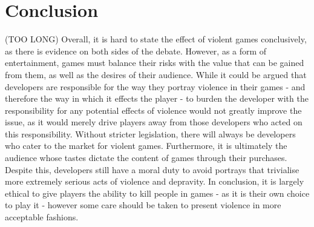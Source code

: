 \documentclass{scrartcl}
\begin{document}
	\section{Conclusion} (TOO LONG)
		Overall, it is hard to state the effect of violent games conclusively, as there is evidence on both sides of the debate. However, as a form of entertainment, games must balance their risks with the value that can be gained from them, as well as the desires of their audience. While it could be argued that developers are responsible for the way they portray violence in their games - and therefore the way in which it effects the player - to burden the developer with the responsibility for any potential effects of violence would not greatly improve the issue, as it would merely drive players away from those developers who acted on this responsibility. Without stricter legislation, there will always be developers who cater to the market for violent games. Furthermore, it is ultimately the audience whose tastes dictate the content of games through their purchases. Despite this, developers still have a moral duty to avoid portrays that trivialise more extremely serious acts of violence and depravity. In conclusion, it is largely ethical to give players the ability to kill people in games - as it is their own choice to play it - however some care should be taken to present violence in more acceptable fashions.
	

	
	
	
\end{document}
